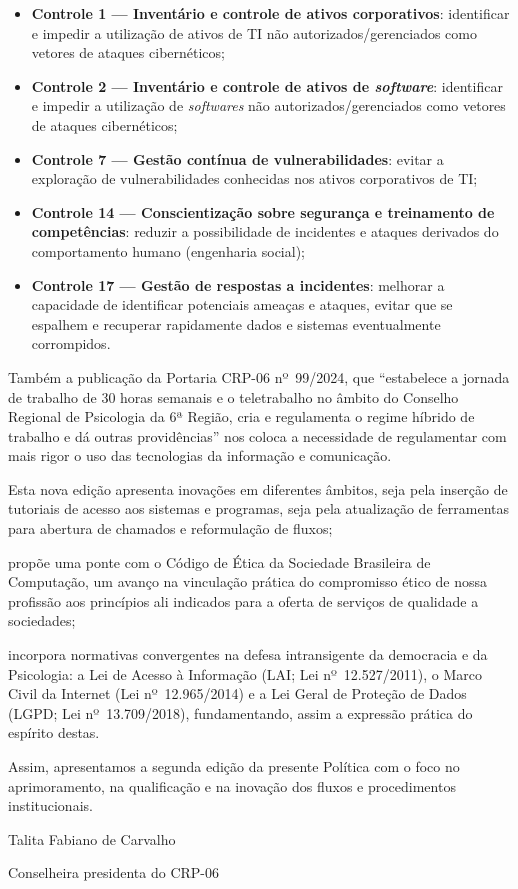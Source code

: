 \begin{itemize}[]
\item \textbf{Controle 1 --- Inventário e controle de ativos corporativos}:
    identificar e impedir a utilização de ativos de TI não
    autorizados/gerenciados como vetores de ataques cibernéticos;

\item \textbf{Controle 2 --- Inventário e controle de ativos de
      \emph{software}}: identificar e impedir a utilização de \emph{softwares}
    não autorizados/gerenciados como vetores de ataques cibernéticos;

\item \textbf{Controle 7 --- Gestão contínua de vulnerabilidades}:
    evitar a exploração de vulnerabilidades conhecidas nos ativos
    corporativos de TI;

\item \textbf{Controle 14 --- Conscientização sobre segurança e
      treinamento de competências}: reduzir a possibilidade de incidentes e
    ataques derivados do comportamento humano (engenharia social);

\item \textbf{Controle 17 --- Gestão de respostas a incidentes}: melhorar a
    capacidade de identificar potenciais ameaças e ataques, evitar que se
    espalhem e recuperar rapidamente dados e sistemas eventualmente
    corrompidos.
\end{itemize}

Também a publicação da Portaria CRP-06 nº~99/2024, que ``estabelece a
jornada de trabalho de 30 horas semanais e o teletrabalho no âmbito do
Conselho Regional de Psicologia da 6ª Região, cria e regulamenta o
regime híbrido de trabalho e dá outras providências'' nos coloca a
necessidade de regulamentar com mais rigor o uso das tecnologias da
informação e comunicação.

Esta nova edição apresenta inovações em diferentes âmbitos, seja pela
inserção de tutoriais de acesso aos sistemas e programas, seja pela
atualização de ferramentas para abertura de chamados e reformulação de
fluxos;

propõe uma ponte com o Código de Ética da Sociedade Brasileira de
Computação, um avanço na vinculação prática do compromisso ético de
nossa profissão aos princípios ali indicados para a oferta de serviços
de qualidade a sociedades;

incorpora normativas convergentes na defesa intransigente da democracia
e da Psicologia: a Lei de Acesso à Informação (LAI; Lei nº~12.527/2011),
o Marco Civil da Internet (Lei nº~12.965/2014) e a Lei Geral de Proteção
de Dados (LGPD; Lei nº~13.709/2018), fundamentando, assim a expressão
prática do espírito destas.

Assim, apresentamos a segunda edição da presente Política com o foco no
aprimoramento, na qualificação e na inovação dos fluxos e procedimentos
institucionais.

Talita Fabiano de Carvalho

Conselheira presidenta do CRP-06
